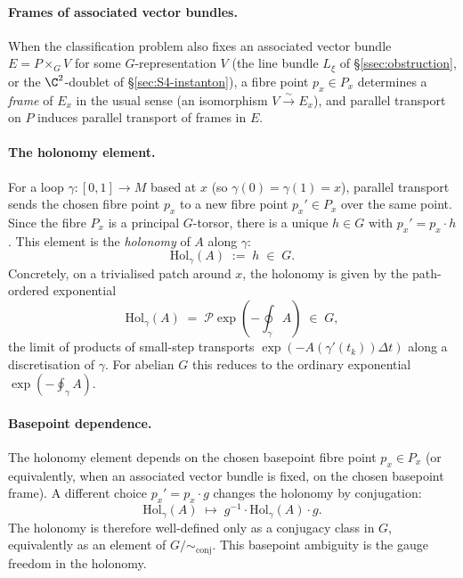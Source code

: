 \paragraph{Frames of associated vector bundles.} When the
classification problem also fixes an associated vector bundle
$E=P\times_G V$ for some $G$-representation $V$ (the line bundle
$L_\xi$ of \S\ref{ssec:obstruction}, or the $\C^2$-doublet of
\S\ref{sec:S4-instanton}), a fibre point $p_x\in P_x$ determines a
\emph{frame} of $E_x$ in the usual sense (an isomorphism
$V\xrightarrow{\sim} E_x$), and parallel transport on $P$ induces
parallel transport of frames in $E$.

\paragraph{The holonomy element.} For a loop $\gamma\colon[0,1]\to M$
based at $x$ (so $\gamma(0)=\gamma(1)=x$), parallel transport sends
the chosen fibre point $p_x$ to a new fibre point $p_x'\in P_x$ over
the same point. Since the fibre $P_x$ is a principal $G$-torsor,
there is a unique $h\in G$ with $p_x'=p_x\cdot h$. This element is the
\emph{holonomy} of $A$ along $\gamma$:
\[
   \mathrm{Hol}_\gamma(A) \;:=\; h \;\in\; G.
\]
Concretely, on a trivialised patch around $x$, the holonomy is given
by the path-ordered exponential
\[
   \mathrm{Hol}_\gamma(A)
   \;=\;
   \mathcal{P}\exp\!\left(-\oint_\gamma A\right) \;\in\; G,
\]
the limit of products of small-step transports
$\exp(-A(\gamma'(t_k))\Delta t)$ along a discretisation of $\gamma$.
For abelian $G$ this reduces to the ordinary exponential
$\exp(-\oint_\gamma A)$.

\paragraph{Basepoint dependence.} The holonomy element depends
on the chosen basepoint fibre point $p_x\in P_x$ (or equivalently,
when an associated vector bundle is fixed, on the chosen basepoint
frame). A different choice
$p_x'=p_x\cdot g$ changes the holonomy by conjugation:
\[
   \mathrm{Hol}_\gamma(A) \;\mapsto\; g^{-1}\cdot
   \mathrm{Hol}_\gamma(A)\cdot g.
\]
The holonomy is therefore well-defined only as a conjugacy class in
$G$, equivalently as an element of $G/\!\sim_{\mathrm{conj}}$. This
basepoint ambiguity is the gauge freedom in the holonomy.

